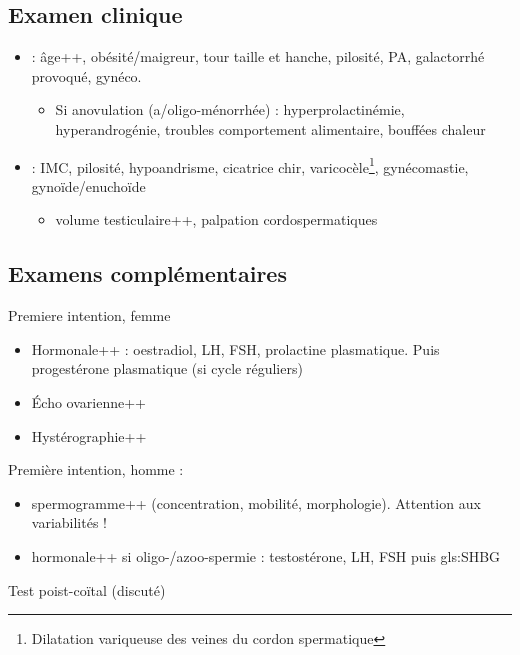 \documentclass{book}
\begin{document}
\subsection{Examen clinique}
\label{sec:orgae155cb}
\begin{itemize}
\item \female : âge++, obésité/maigreur, tour taille et hanche, pilosité, PA,
galactorrhé provoqué, gynéco.
\begin{itemize}
\item Si anovulation (a/oligo-ménorrhée) : hyperprolactinémie, hyperandrogénie,
troubles comportement alimentaire, bouffées chaleur
\end{itemize}
\item \male : IMC, pilosité, hypoandrisme, cicatrice chir, varicocèle\footnote{Dilatation variqueuse des veines du cordon spermatique},
gynécomastie, gynoïde/enuchoïde
\begin{itemize}
\item volume testiculaire++, palpation cordospermatiques
\end{itemize}
\end{itemize}

\subsection{Examens complémentaires}
\label{sec:org15218e5}
Premiere intention, femme
\begin{itemize}
\item Hormonale++ : oestradiol, LH, FSH, prolactine plasmatique. Puis progestérone plasmatique (si cycle réguliers)
\item Écho ovarienne++
\item Hystérographie++
\end{itemize}
Première intention, homme :
\begin{itemize}
\item spermogramme++ (concentration, mobilité, morphologie). Attention aux variabilités !
\item hormonale++ si oligo-/azoo-spermie : testostérone, LH, FSH puis gls:SHBG
\end{itemize}
Test poist-coïtal (discuté)
\end{document}
